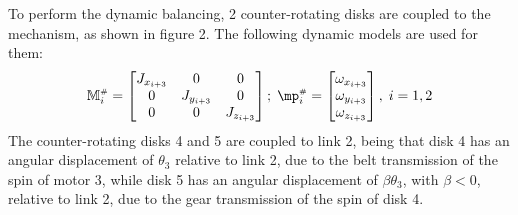 \documentclass[a4paper,11pt,brazil,fleqn]{article}
\begin{document}
To perform the dynamic balancing, 2 counter-rotating disks are coupled to the mechanism, as shown in figure 2. The following dynamic models are used for them:
\begin{equation}\label{eq:DiscsModel2}
\mM\ssh_i = \begin{bmatrix} J_{x_{i+3}} & 0 & 0 \\ 0 & J_{y_{i+3}} & 0 \\ 0 & 0 & J_{z_{i+3}} \end{bmatrix}; \; \mp\ssh_i = \begin{bmatrix} \omega_{x_{i+3}} \\ \omega_{y_{i+3}} \\ \omega_{z_{i+3}} \end{bmatrix}, \; i = 1, 2
\end{equation}
The counter-rotating disks 4 and 5 are coupled to link 2, being that disk 4 has an angular displacement of $\theta_3$ relative to link 2, due to the belt transmission of the spin of motor 3, while disk 5 has an angular displacement of $\beta\theta_3$, with $\beta < 0$, relative to link 2, due to the gear transmission of the spin of disk 4.
\end{document}
